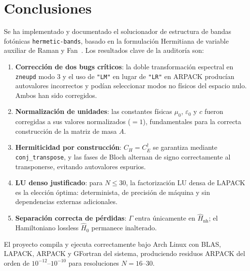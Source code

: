 \documentclass[12pt,a4paper]{article}
\newcommand{\Hhat}{\hat{H}}
\begin{document}
\section{Conclusiones}

Se ha implementado y documentado el solucionador de estructura de bandas
fotónicas \texttt{hermetic-bands}, basado en la formulación Hermitiana
de variable auxiliar de Raman y Fan~\cite{Raman2010}.
Los resultados clave de la auditoría son:

\begin{enumerate}
  \item \textbf{Corrección de dos bugs críticos}: la doble transformación
    espectral en \texttt{zneupd} modo 3 y el uso de \texttt{"LM"} en
    lugar de \texttt{"LR"} en ARPACK producían autovalores incorrectos
    y podían seleccionar modos no físicos del espacio nulo.
    Ambos han sido corregidos.

  \item \textbf{Normalización de unidades}: las constantes físicas
    $\mu_0$, $\varepsilon_0$ y $c$ fueron corregidas a sus valores
    normalizados ($=1$), fundamentales para la correcta construcción
    de la matriz de masa $A$.

  \item \textbf{Hermiticidad por construcción}: $C_H = C_E^\dagger$
    se garantiza mediante \texttt{conj\_transpose}, y las fases de
    Bloch alternan de signo correctamente al transponerse, evitando
    autovalores espurios.

  \item \textbf{LU denso justificado}: para $N \leq 30$, la
    factorización LU densa de LAPACK es la elección óptima: determinista,
    de precisión de máquina y sin dependencias externas adicionales.

  \item \textbf{Separación correcta de pérdidas}: $\Gamma$ entra
    únicamente en $\Hhat_\text{nh}$; el Hamiltoniano lossless $\Hhat_0$
    permanece inalterado.
\end{enumerate}

El proyecto compila y ejecuta correctamente bajo Arch Linux con BLAS,
LAPACK, ARPACK y GFortran del sistema, produciendo residuos ARPACK
del orden de $10^{-12}$--$10^{-10}$ para resoluciones $N=16$--$30$.
\end{document}
